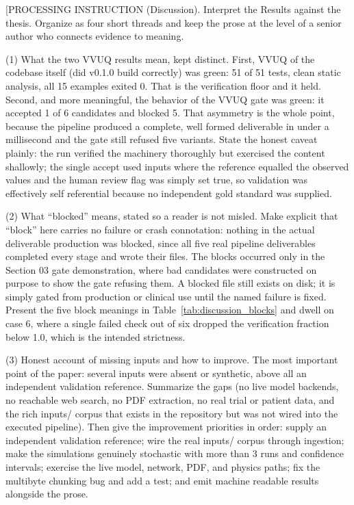 
[PROCESSING INSTRUCTION (Discussion). Interpret the Results against the
thesis. Organize as four short threads and keep the prose at the level of
a senior author who connects evidence to meaning.

(1) What the two VVUQ results mean, kept distinct. First, VVUQ of the
codebase itself (did v0.1.0 build correctly) was green: 51 of 51 tests,
clean static analysis, all 15 examples exited 0. That is the verification
floor and it held. Second, and more meaningful, the behavior of the VVUQ
gate was green: it accepted 1 of 6 candidates and blocked 5. That
asymmetry is the whole point, because the pipeline produced a complete,
well formed deliverable in under a millisecond and the gate still refused
five variants. State the honest caveat plainly: the run verified the
machinery thoroughly but exercised the content shallowly; the single
accept used inputs where the reference equalled the observed values and
the human review flag was simply set true, so validation was effectively
self referential because no independent gold standard was supplied.

(2) What ``blocked'' means, stated so a reader is not misled. Make
explicit that ``block'' here carries no failure or crash connotation:
nothing in the actual deliverable production was blocked, since all five
real pipeline deliverables completed every stage and wrote their files.
The blocks occurred only in the Section 03 gate demonstration, where bad
candidates were constructed on purpose to show the gate refusing them. A
blocked file still exists on disk; it is simply gated from
production or clinical use until the named failure is fixed. Present the
five block meanings in Table~\ref{tab:discussion_blocks} and dwell on case
6, where a single failed check out of six dropped the verification
fraction below 1.0, which is the intended strictness.

(3) Honest account of missing inputs and how to improve. The most
important point of the paper: several inputs were absent or synthetic,
above all an independent validation reference. Summarize the gaps (no live
model backends, no reachable web search, no PDF extraction, no real trial
or patient data, and the rich inputs/ corpus that exists in the repository
but was not wired into the executed pipeline). Then give the improvement
priorities in order: supply an independent validation reference; wire the
real inputs/ corpus through ingestion; make the simulations genuinely
stochastic with more than 3 runs and confidence intervals; exercise the
live model, network, PDF, and physics paths; fix the multibyte chunking
bug and add a test; and emit machine readable results alongside the prose.

